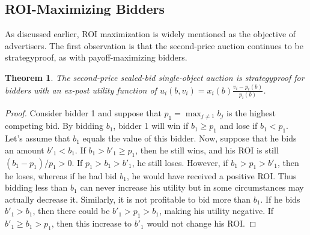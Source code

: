 \documentclass{article}
\newtheorem{theorem}{Theorem}[section]
\begin{document}
\subsection{ROI-Maximizing Bidders}
As discussed earlier, ROI maximization is widely mentioned as the objective of advertisers. 
The first observation is that the second-price auction continues to be strategyproof, as with payoff-maximizing bidders.  

\begin{theorem} \label{thm:roi_sp}
	The second-price sealed-bid single-object auction is strategyproof for bidders with an ex-post utility function of $u_i(b, v_i) = x_i(b) \tfrac{ v_i - p_i(b)}{p_i(b)}$.
\end{theorem}

\begin{proof}
Consider bidder 1 and suppose that $p_1 = \max_{j\ne 1}b_j$ is the highest competing bid. By bidding $b_1$, bidder 1 will win if $b_1 \geq p_1$ and lose if $b_1 < p_1$. Let's assume that $b_1$ equals the value of this bidder. Now, suppose that he bids an amount $b'_1 < b_1$. If $b_1 > b'_1 \geq p_1$, then he still wins, and his ROI is still $(b_1-p_1)/p_1 >0$. If $p_1 > b_1 > b'_1$, he still loses. However, if $b_1 > p_1 > b'_1$, then he loses, whereas if he had bid $b_1$, he would have received a positive ROI. Thus bidding less than $b_1$ can never increase his utility but in some circumstances may actually decrease it. Similarly, it is not profitable to bid more than $b_1$. If he bids $b'_1 > b_1$, then there could be $b'_1 > p_1 > b_1$, making his utility negative. If $b'_1 \geq b_1 > p_1$, then this increase to $b'_1$ would not change his ROI.
\end{proof}
\end{document}
